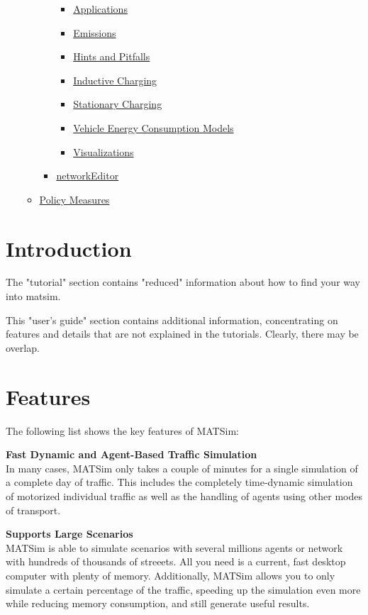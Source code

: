 \documentclass[a4paper,11pt]{report}
\begin{document}
\begin{itemize}
\begin{itemize}
\begin{itemize}
\begin{itemize}
	\item \href{http://www.matsim.org/node/720}{Applications}
	\item \href{http://www.matsim.org/node/719}{Emissions}
	\item \href{http://www.matsim.org/node/718}{Hints and Pitfalls}
	\item \href{http://www.matsim.org/node/715}{Inductive Charging}
	\item \href{http://www.matsim.org/node/717}{Stationary Charging}
	\item \href{http://www.matsim.org/node/716}{Vehicle Energy Consumption Models}
	\item \href{http://www.matsim.org/node/721}{Visualizations}
\end{itemize}
	\item \href{http://www.matsim.org/docs/extensions/networkEditor}{networkEditor}
\end{itemize}
	\item \href{http://www.matsim.org/node/563}{Policy Measures}
\end{itemize}
\end{itemize}


\chapter{Introduction}

The "tutorial" section contains "reduced" information about how to find your way into matsim.

This "user's guide" section contains additional information,  concentrating on features and details that are not explained in the  tutorials. Clearly, there may be overlap.

\chapter{Features}

The following list shows the key features of MATSim:

\textbf{Fast Dynamic and Agent-Based Traffic Simulation}
\\  In many cases, MATSim only takes a couple of minutes for a single  simulation of a complete day of traffic. This includes the completely  time-dynamic simulation of motorized individual traffic as well as the  handling of agents using other modes of transport.

\textbf{Supports Large Scenarios}
\\  MATSim is able to simulate scenarios with several millions agents or  network with hundreds of thousands of streeets. All you need is a  current, fast desktop computer with plenty of memory. Additionally,  MATSim allows you to only simulate a certain percentage of the traffic,  speeding up the simulation even more while reducing memory consumption,  and still generate useful results.
\end{document}
